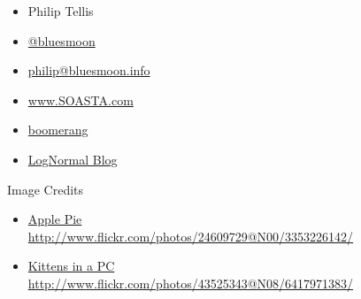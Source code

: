 \documentclass{beamer}
\begin{document}
\begin{frame}
  \begin{itemize}
  \item Philip Tellis
  \item \href{http://twitter.com/bluesmoon}{@bluesmoon}
  \item \href{http://bluesmoon.info/}{philip@bluesmoon.info}
  \item \href{http://www.soasta.com/}{www.SOASTA.com}
  \item \href{http://lognormal.github.com/boomerang/doc/}{boomerang}
  \item \href{http://www.lognormal.com/blog/}{LogNormal Blog}
  \end{itemize}
\end{frame}

\begin{frame}{Image Credits}
\begin{itemize}
  \item \href{http://www.flickr.com/photos/24609729@N00/3353226142/}{Apple Pie  \\ \small http://www.flickr.com/photos/24609729@N00/3353226142/}
  \item \href{http://www.flickr.com/photos/43525343@N08/6417971383/}{Kittens in a PC  \\ \small http://www.flickr.com/photos/43525343@N08/6417971383/}
\end{itemize}
\end{frame}
\end{document}
